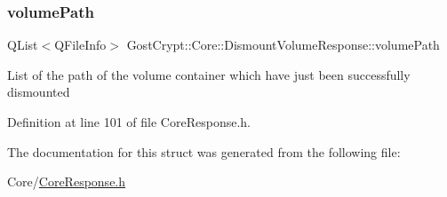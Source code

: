 \subsubsection{\texorpdfstring{volume\+Path}{volumePath}}
{\footnotesize\ttfamily Q\+List$<$Q\+File\+Info$>$ Gost\+Crypt\+::\+Core\+::\+Dismount\+Volume\+Response\+::volume\+Path}

List of the path of the volume container which have just been successfully dismounted 

Definition at line 101 of file Core\+Response.\+h.



The documentation for this struct was generated from the following file\+:\begin{DoxyCompactItemize}
\item 
Core/\hyperlink{_core_response_8h}{Core\+Response.\+h}\end{DoxyCompactItemize}
